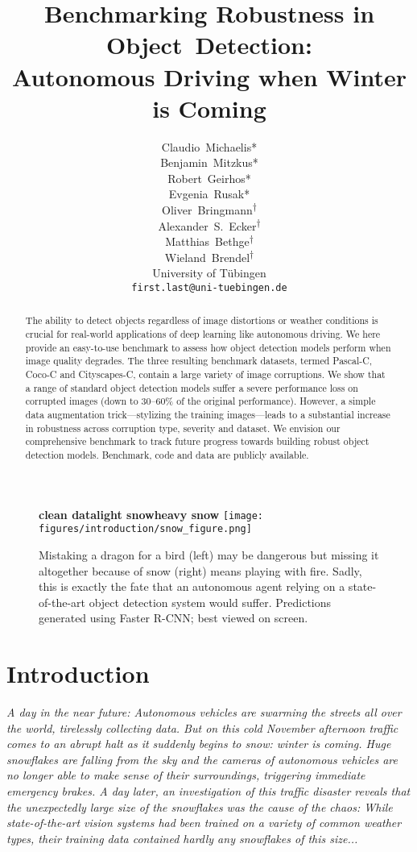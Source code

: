 \documentclass{article}
\title{Benchmarking Robustness in Object~Detection:\\Autonomous Driving when Winter is Coming}
\author{Claudio~Michaelis* \\
  \And
  Benjamin~Mitzkus* \\
  \And
  Robert~Geirhos* \\
  \And
  Evgenia~Rusak* \\
  \And
  Oliver~Bringmann\textsuperscript{$\dagger$} \\
  \And
  Alexander~S.~Ecker\textsuperscript{$\dagger$} \\
  \And
  Matthias~Bethge\textsuperscript{$\dagger$} \\
  \And
  Wieland~Brendel\textsuperscript{$\dagger$} \\
  University of T\"ubingen \\
  \texttt{first.last@uni-tuebingen.de} \\
}
\begin{document}
\maketitle

\begin{abstract}
    The ability to detect objects regardless of image distortions or weather conditions is crucial for real-world applications of deep learning like autonomous driving. We here provide an easy-to-use benchmark to assess how object detection models perform when image quality degrades. The three resulting benchmark datasets, termed Pascal-C, Coco-C and Cityscapes-C, contain a large variety of image corruptions. We show that a range of standard object detection models suffer a severe performance loss on corrupted images (down to 30--60\% of the original performance). However, a simple data augmentation trick---stylizing the training images---leads to a substantial increase in robustness across corruption type, severity and dataset. We envision our comprehensive benchmark to track future progress towards building robust object detection models. Benchmark, code and data are publicly available.
\end{abstract}




\begin{figure}[h!]
    \textbf{clean data\hspace{90pt}light snow\hspace{90pt}heavy snow}
    \centering
    \texttt{[image: figures/introduction/snow\_figure.png]}
    \caption{Mistaking a dragon for a bird (left) may be dangerous but missing it altogether because of snow (right) means playing with fire. Sadly, this is exactly the fate that an autonomous agent relying on a state-of-the-art object detection system would suffer. Predictions generated using Faster R-CNN; best viewed on screen.}
    \label{fig:teaser}
    \vspace{-0.2cm}
\end{figure}

\section{Introduction}
  \label{Introduction}
\begin{adjustwidth}{30pt}{30pt}
\textit{A day in the near future: Autonomous vehicles are swarming the streets all over the world, tirelessly collecting data. But on this cold November afternoon traffic comes to an abrupt halt as it suddenly begins to snow: winter is coming. Huge snowflakes are falling from the sky and the cameras of autonomous vehicles are no longer able to make sense of their surroundings, triggering immediate emergency brakes. A day later, an investigation of this traffic disaster reveals that the unexpectedly large size of the snowflakes was the cause of the chaos: While state-of-the-art vision systems had been trained on a variety of common weather types, their training data contained hardly any snowflakes of this size...
}\\
\end{adjustwidth}
\end{document}
